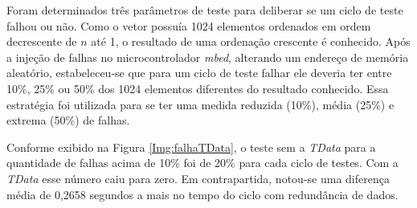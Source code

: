 Foram determinados três parâmetros de teste para deliberar se um ciclo de teste falhou ou não. Como o vetor possuía 1024 elementos ordenados em ordem decrescente de $n$ até 1, o resultado de uma ordenação crescente é conhecido. Após a injeção de falhas no microcontrolador \textit{mbed}, alterando um endereço de memória aleatório, estabeleceu-se que para um ciclo de teste falhar ele deveria ter entre 10\%, 25\% ou 50\% dos 1024 elementos diferentes do resultado conhecido. Essa estratégia foi utilizada para se ter uma medida reduzida (10\%), média (25\%) e extrema (50\%) de falhas.

Conforme exibido na Figura \ref{Img:falhaTData}, o teste sem a \textit{TData} para a quantidade de falhas acima de 10\% foi de 20\% para cada ciclo de testes. Com a \textit{TData} esse número caiu para zero. Em contrapartida, notou-se uma diferença média de 0,2658 segundos a mais no tempo do ciclo com redundância de dados. 




